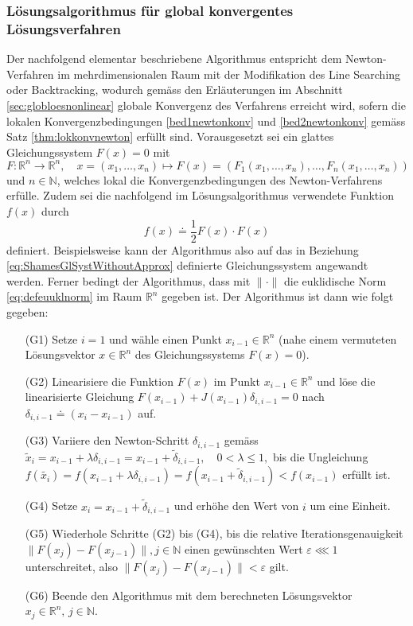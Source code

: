 \documentclass[a4paper,12pt]{article}
\numberwithin{equation}{section}
\begin{document}
\subsubsection{Lösungsalgorithmus für global konvergentes Lösungsverfahren}\label{sec:loesalgoglobal}
Der nachfolgend elementar beschriebene Algorithmus entspricht dem Newton-Verfahren im mehrdimensionalen Raum mit der Modifikation des Line Searching oder Backtracking, wodurch gemäss den Erläuterungen im Abschnitt \ref{sec:globloesnonlinear} globale Konvergenz des Verfahrens erreicht wird, sofern die lokalen Konvergenzbedingungen \ref{bed1newtonkonv} und \ref{bed2newtonkonv} gemäss Satz \ref{thm:lokkonvnewton} erfüllt sind.  Vorausgesetzt sei ein glattes Gleichungssystem $F(x) = 0$ mit \begin{equation}
F: \mathbb{R}^n \rightarrow \mathbb{R}^n, \quad x = (x_1,\dots,x_n) \mapsto F(x) = (F_1(x_1,\dots,x_n),\dots,F_n(x_1,\dots,x_n))
\end{equation} und $n \in \mathbb{N}$, welches lokal die Konvergenzbedingungen des Newton-Verfahrens erfülle. Zudem sei die nachfolgend im Lösungsalgorithmus verwendete Funktion $f(x)$ durch \begin{equation}
f(x) \doteq \frac{1}{2}F(x)\cdot F(x)
\end{equation} definiert. Beispielsweise kann der Algorithmus also auf das in Beziehung \eqref{eq:ShamesGlSystWithoutApprox} definierte Gleichungssystem angewandt werden. Ferner bedingt der Algorithmus, dass mit $\|\cdot\|$ die euklidische Norm \eqref{eq:defeuuklnorm} im Raum $\mathbb{R}^n$ gegeben ist. Der Algorithmus ist dann wie folgt gegeben:
\begin{itemize}
\item[(G1)] Setze $i=1$ und wähle einen Punkt $x_{i-1}\in\mathbb{R}^n$ (nahe einem vermuteten Lösungsvektor $x \in \mathbb{R}^n$ des Gleichungssystems $F(x) = 0$).
\item[(G2)] Linearisiere die Funktion $F(x)$ im Punkt $x_{i-1}\in\mathbb{R}^n$ und löse die linearisierte Gleichung $F(x_{i-1}) + J(x_{i-1})\delta_{i,i-1} = 0$ nach $\delta_{i,i-1} \doteq (x_i-x_{i-1})$ auf.
\item[(G3)] Variiere den Newton-Schritt $\delta_{i,i-1}$ gemäss $
\tilde{x}_i = x_{i-1} + \lambda \delta_{i,i-1} = x_{i-1} + \tilde{\delta}_{i,i-1}, \quad 0 < \lambda \leq 1,
$ bis die Ungleichung $
f(\tilde{x_i}) = f(x_{i-1}+\lambda \delta_{i,i-1}) = f(x_{i-1}+ \tilde{\delta}_{i,i-1}) < f(x_{i-1})
$ erfüllt ist.
\item[(G4)] Setze $x_i = x_{i-1} + \tilde{\delta}_{i,i-1}$ und erhöhe den Wert von $i$ um eine Einheit.
\item[(G5)] Wiederhole Schritte (G2) bis (G4), bis die relative Iterationsgenauigkeit $\|F(x_j)-F(x_{j-1})\|, j \in \mathbb{N}$ einen gewünschten Wert $\varepsilon \lll 1$ unterschreitet, also $\|F(x_j)-F(x_{j-1})\| < \varepsilon$ gilt.
\item[(G6)] Beende den Algorithmus mit dem berechneten Lösungsvektor $x_j \in \mathbb{R}^n, \,j \in \mathbb{N}$.
\end{itemize}
\end{document}
